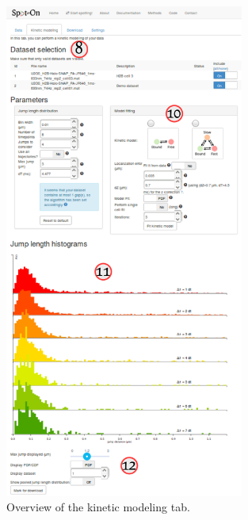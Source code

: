 \begin{figure}[H]
\centering
\includegraphics[width=0.7\textwidth]{../SPTGUI/static/SPTGUI/img/tutorial/0.7/tuto4.png}
\caption{\label{fig:tuto4}Overview of the kinetic modeling tab.}
\end{figure}


